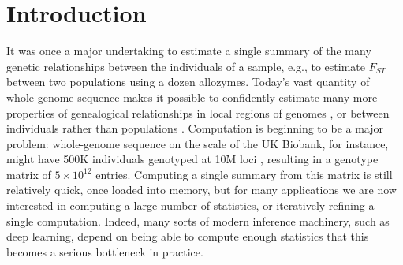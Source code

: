 \documentclass{article}
\begin{document}
%
%
%
%
%
%
%
%
%



\section*{Introduction}

It was once a major undertaking to estimate a single summary
of the many genetic relationships between the individuals of a sample,
e.g., to estimate $F_{ST}$ between two populations using a dozen allozymes.
Today's vast quantity of whole-genome sequence
makes it possible to confidently estimate many more properties of genealogical relationships
in local regions of genomes \citep{stankowski2019widespread,fst_landscapes},
or between individuals rather than populations \citep{individual_stats}.
Computation is beginning to be a major problem:
whole-genome sequence on the scale of the UK Biobank,
for instance, might have 500K individuals genotyped at 10M loci \citep{ukbb},
resulting in a genotype matrix of $5 \times 10^{12}$ entries.
Computing a single summary from this matrix is still relatively quick,
once loaded into memory,
but for many applications we are now interested in computing a large number of statistics,
or iteratively refining a single computation.
Indeed, many sorts of modern inference machinery, such as deep learning,
depend on being able to compute enough statistics that this becomes a serious bottleneck in practice.
\end{document}
